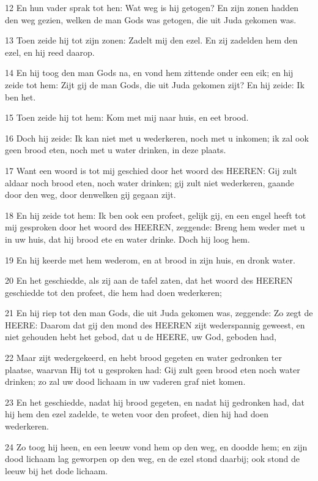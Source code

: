 \par 12 En hun vader sprak tot hen: Wat weg is hij getogen? En zijn zonen hadden den weg gezien, welken de man Gods was getogen, die uit Juda gekomen was.
\par 13 Toen zeide hij tot zijn zonen: Zadelt mij den ezel. En zij zadelden hem den ezel, en hij reed daarop.
\par 14 En hij toog den man Gods na, en vond hem zittende onder een eik; en hij zeide tot hem: Zijt gij de man Gods, die uit Juda gekomen zijt? En hij zeide: Ik ben het.
\par 15 Toen zeide hij tot hem: Kom met mij naar huis, en eet brood.
\par 16 Doch hij zeide: Ik kan niet met u wederkeren, noch met u inkomen; ik zal ook geen brood eten, noch met u water drinken, in deze plaats.
\par 17 Want een woord is tot mij geschied door het woord des HEEREN: Gij zult aldaar noch brood eten, noch water drinken; gij zult niet wederkeren, gaande door den weg, door denwelken gij gegaan zijt.
\par 18 En hij zeide tot hem: Ik ben ook een profeet, gelijk gij, en een engel heeft tot mij gesproken door het woord des HEEREN, zeggende: Breng hem weder met u in uw huis, dat hij brood ete en water drinke. Doch hij loog hem.
\par 19 En hij keerde met hem wederom, en at brood in zijn huis, en dronk water.
\par 20 En het geschiedde, als zij aan de tafel zaten, dat het woord des HEEREN geschiedde tot den profeet, die hem had doen wederkeren;
\par 21 En hij riep tot den man Gods, die uit Juda gekomen was, zeggende: Zo zegt de HEERE: Daarom dat gij den mond des HEEREN zijt wederspannig geweest, en niet gehouden hebt het gebod, dat u de HEERE, uw God, geboden had,
\par 22 Maar zijt wedergekeerd, en hebt brood gegeten en water gedronken ter plaatse, waarvan Hij tot u gesproken had: Gij zult geen brood eten noch water drinken; zo zal uw dood lichaam in uw vaderen graf niet komen.
\par 23 En het geschiedde, nadat hij brood gegeten, en nadat hij gedronken had, dat hij hem den ezel zadelde, te weten voor den profeet, dien hij had doen wederkeren.
\par 24 Zo toog hij heen, en een leeuw vond hem op den weg, en doodde hem; en zijn dood lichaam lag geworpen op den weg, en de ezel stond daarbij; ook stond de leeuw bij het dode lichaam.
